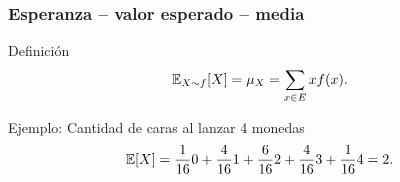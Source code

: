 \documentclass[table]{beamer}
\begin{document}
\begin{frame}
    \frametitle{Esperanza -- valor esperado -- media}
    \begin{block}{Definición}
        \begin{equation*}
            \expecteddist{X \sim f}{X} = \mu_{X} = \sum_{x \in E} x \ff{x} .
        \end{equation*}
    \end{block}
    \begin{exampleblock}{Ejemplo: Cantidad de caras al lanzar 4 monedas}
                \begin{equation*}
                    \expected{X} = \frac{1}{16} 0 + \frac{4}{16} 1 + \frac{6}{16} 2 + \frac{4}{16} 3 + \frac{1}{16} 4 = 2 .
                \end{equation*}
    \end{exampleblock}
\end{frame}
\end{document}
